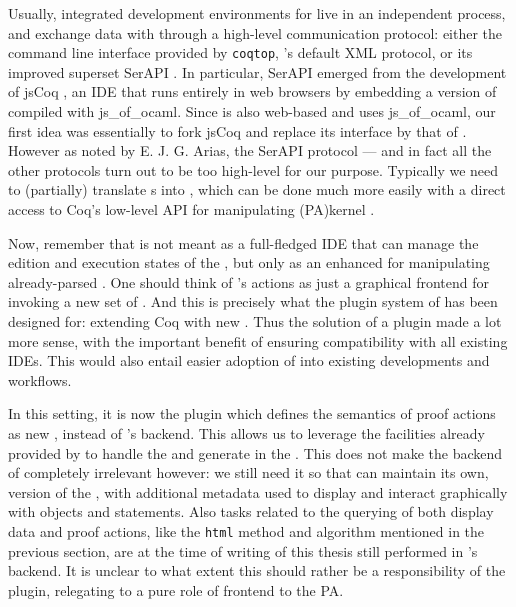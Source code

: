 Usually, integrated development environments for  live in an independent
process, and exchange data with  through a high-level communication protocol:
either the command line interface provided by \texttt{coqtop}, 's default XML
protocol, or its improved superset SerAPI .
In particular, SerAPI emerged from the development of jsCoq
, an IDE that runs entirely in web browsers by
embedding a version of  compiled with js\_of\_ocaml. Since  is also
web-based and uses js\_of\_ocaml, our first idea was essentially to fork jsCoq
and replace its interface by that of . However as noted by E. J. G. Arias,
the SerAPI protocol --- and in fact all the other protocols turn out to be too
high-level for our purpose. Typically we need to (partially) translate  s
into  , which can be done much more easily with a direct access to
Coq's low-level API for manipulating \kl(PA){kernel} .

Now, remember that  is not meant as a full-fledged IDE that can manage the
edition and execution states of the , but only as an enhanced  for manipulating already-parsed . One should think of 's actions
as just a graphical frontend for invoking a new set of . And this is
precisely what the plugin system of  has been designed for: extending Coq
with new . Thus the solution of a  plugin made a lot more sense, with
the important benefit of ensuring compatibility with all existing IDEs. This
would also entail easier adoption of  into existing  developments and
workflows.

In this setting, it is now the  plugin which defines the semantics of proof
actions as new , instead of 's backend. This allows us to leverage
the facilities already provided by  to handle the  and generate
 in the . This does not
make the backend of  completely irrelevant however: we still need it so
that  can maintain its own,  version of the ,
with additional metadata used to display and interact graphically with objects
and statements. Also tasks related to the querying of both display data and
proof actions, like the \texttt{html} method and  algorithm mentioned
in the previous section, are at the time of writing of this thesis still
performed in 's backend. It is unclear to what extent this should rather
be a responsibility of the  plugin, relegating  to a pure role of
frontend to the PA.

